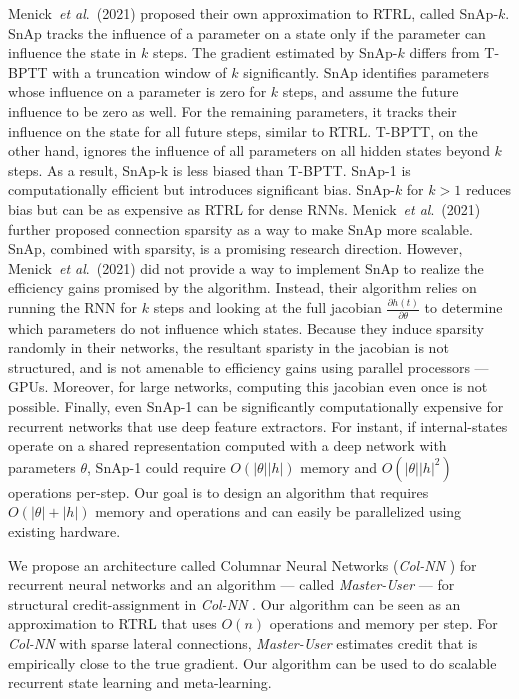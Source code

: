 \documentclass{article}
\newcommand{\etal}{\textit{et al}.}
\newcommand{\algoname}{\textit{Master-User} }
\newcommand{\archi}{\textit{Col-NN} }
\begin{document}
 Menick~\etal~(2021) proposed their own approximation to RTRL, called SnAp-$k$. SnAp tracks the influence of a parameter on a state only if the parameter can influence the state in $k$ steps. The gradient estimated by SnAp-$k$ differs from T-BPTT with a truncation window of $k$ significantly. SnAp identifies parameters whose influence on a parameter is zero for $k$ steps, and assume the future influence to be zero as well. For the remaining parameters, it tracks their influence on the state for all future steps, similar to RTRL. T-BPTT, on the other hand, ignores the influence of all parameters on all hidden states beyond $k$ steps. As a result, SnAp-k is less biased than T-BPTT. SnAp-1 is computationally efficient but introduces significant bias. SnAp-$k$ for $k>1$ reduces bias but can be as expensive as RTRL for dense RNNs.  Menick~\etal~(2021) further proposed connection sparsity as a way to make SnAp more scalable. SnAp, combined with sparsity, is a promising research direction. However, Menick~\etal~(2021) did not provide a way to implement SnAp to realize the efficiency gains promised by the algorithm. Instead, their algorithm relies on running the RNN for $k$ steps and looking at the full jacobian $\frac{\partial h(t)}{\partial \theta}$ to determine which parameters do not influence which states. Because they induce sparsity randomly in their networks, the resultant sparisty in the jacobian is not structured, and is not amenable to efficiency gains using parallel processors --- GPUs. Moreover, for large networks, computing this jacobian even once is not possible.  Finally, even SnAp-1 can be significantly computationally expensive for recurrent networks that use deep feature extractors. For instant, if internal-states operate on a shared representation computed with a deep network with parameters $\theta$, SnAp-1 could require $O(|\theta||h|)$ memory and $O(|\theta||h|^2)$ operations per-step. Our goal is to design an algorithm that requires $O(|\theta| + |h|)$ memory and operations and can easily be parallelized using existing hardware.



We propose an architecture called Columnar Neural Networks (\archi) for recurrent neural networks and an algorithm --- called \algoname --- for structural credit-assignment in \archi. Our algorithm can be seen as an approximation to RTRL that uses $O(n)$ operations and memory per step. For \archi with sparse lateral connections, \algoname estimates credit that is empirically close to the true gradient. Our algorithm can be used to do scalable recurrent state learning and meta-learning. 
\end{document}
